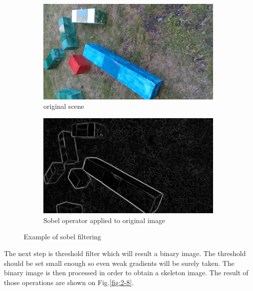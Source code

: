 \documentclass{ctuthesis}
\begin{document}
\begin{figure}[htbp]
     \centering
     \begin{subfigure}{0.475\textwidth}
         \centering
         \includegraphics[width=\textwidth]{orig_cl.jpg}
         \caption{original scene}
         \label{fig:sob-a}
     \end{subfigure}
     \hfill
     \begin{subfigure}{0.475\textwidth}
         \centering
         \includegraphics[width=\textwidth]{sobel.png}
         \caption{Sobel operator applied to original image}
         \label{fig:sob-b}
     \end{subfigure}

        \caption{Example of sobel filtering}
        \label{fig:2-7}
\end{figure}

The next step is threshold filter which will result a binary image. The threshold should be set small enough so even weak gradients will be surely taken. The binary image is then processed in order to obtain a skeleton image. The result of those operations are shown on Fig.\ref{fig:2-8}. 
\end{document}

